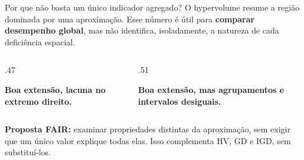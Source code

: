 \begin{frame}{Por que não basta um único indicador agregado?}
O hypervolume resume a região dominada por uma aproximação. Esse número é útil para \textbf{comparar desempenho global}, mas não identifica, isoladamente, a natureza de cada deficiência espacial.
\begin{columns}[T,onlytextwidth]
\begin{column}{.47\textwidth}
\textbf{Boa extensão, lacuna no extremo direito.}
\end{column}
\begin{column}{.51\textwidth}
\textbf{Boa extensão, mas agrupamentos e intervalos desiguais.}
\end{column}
\end{columns}
\vspace{.13cm}
\textbf{Proposta FAIR:} examinar propriedades distintas da aproximação, sem exigir que um único valor explique todas elas. Isso complementa HV, GD e IGD, sem substituí-los.
\end{frame}

